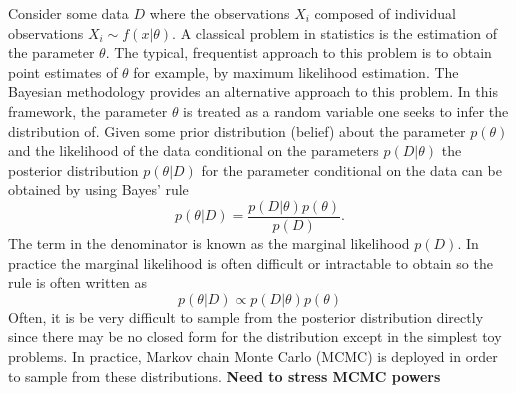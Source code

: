 Consider some data $D$ where the observations $X_i$ composed of individual observations $X_i\sim f(x|\theta)$. A classical problem in statistics is the estimation of the parameter $\theta$. The typical, frequentist approach to this problem is to obtain point estimates of $\theta$ for example, by maximum likelihood estimation. The Bayesian methodology provides an alternative approach to this problem. In this framework, the parameter $\theta$ is treated as a random variable one seeks to infer the distribution of. Given some prior distribution (belief) about the parameter $p(\theta)$ and the likelihood of the data conditional on the parameters $p(D|\theta)$ the posterior distribution $ p(\theta|D)$ for the parameter conditional on the data can be obtained by using Bayes' rule
    \begin{equation}
        p(\theta|D) = \frac{p(D|\theta)p(\theta)}{p(D)}.
    \end{equation}
The term in the denominator is known as the marginal likelihood $p(D)$. In practice the marginal likelihood is often difficult or intractable to obtain so the rule is often written as 
    \begin{equation}
        p(\theta|D) \propto p(D|\theta)p(\theta)
    \end{equation}
Often, it is be very difficult to sample from the posterior distribution directly since there may be no closed form for the distribution except in the simplest toy problems. In practice, {\color{red} Markov chain Monte Carlo (MCMC) is deployed in order to sample from these distributions. \textbf{Need to stress MCMC powers}} 
